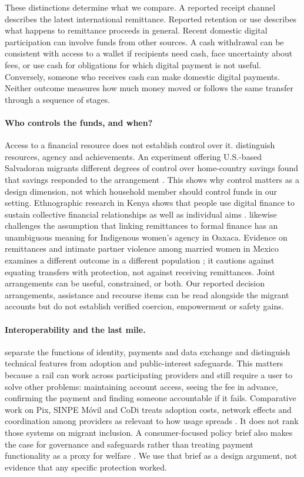 \documentclass[12pt]{article}
\begin{document}
These distinctions determine what we compare. A reported receipt channel describes the latest international remittance. Reported retention or use describes what happens to remittance proceeds in general. Recent domestic digital participation can involve funds from other sources. A cash withdrawal can be consistent with access to a wallet if recipients need cash, face uncertainty about fees, or use cash for obligations for which digital payment is not useful. Conversely, someone who receives cash can make domestic digital payments. Neither outcome measures how much money moved or follows the same transfer through a sequence of stages.

\paragraph{Who controls the funds, and when?}
Access to a financial resource does not establish control over it. \citet{kabeer1999} distinguish resources, agency and achievements. An experiment offering U.S.-based Salvadoran migrants different degrees of control over home-country savings found that savings responded to the arrangement \citep{ashraf2015}. This shows why control matters as a design dimension, not which household member should control funds in our setting. Ethnographic research in Kenya shows that people use digital finance to sustain collective financial relationships as well as individual aims \citep{kusimba_it_2018}. \citet{smyth_challenging_2022} likewise challenges the assumption that linking remittances to formal finance has an unambiguous meaning for Indigenous women's agency in Oaxaca. Evidence on remittances and intimate partner violence among married women in Mexico examines a different outcome in a different population \citep{silveriomurillo_remittances_2022}; it cautions against equating transfers with protection, not against receiving remittances. Joint arrangements can be useful, constrained, or both. Our reported decision arrangements, assistance and recourse items can be read alongside the migrant accounts but do not establish verified coercion, empowerment or safety gains.

\paragraph{Interoperability and the last mile.}
\citet{eaves_rao_verified_2025} separate the functions of identity, payments and data exchange and distinguish technical features from adoption and public-interest safeguards. This matters because a rail can work across participating providers and still require a user to solve other problems: maintaining account access, seeing the fee in advance, confirming the payment and finding someone accountable if it fails. Comparative work on Pix, SINPE Móvil and CoDi treats adoption costs, network effects and coordination among providers as relevant to how usage spreads \citep{argente_verified_2025}. It does not rank those systems on migrant inclusion. A consumer-focused policy brief also makes the case for governance and safeguards rather than treating payment functionality as a proxy for welfare \citep{draper_verified_2024}. We use that brief as a design argument, not evidence that any specific protection worked.
\end{document}
